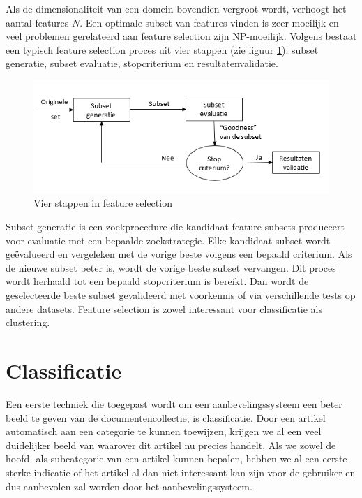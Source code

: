 Als de dimensionaliteit van een domein bovendien vergroot wordt, verhoogt het aantal features $N$. Een optimale subset van features vinden is zeer moeilijk en veel problemen gerelateerd aan feature selection zijn NP-moeilijk. Volgens \cite{Liu2005} bestaat een typisch feature selection proces uit vier stappen (zie figuur \ref{fig:feature-selection}); subset generatie, subset evaluatie, stopcriterium en resultatenvalidatie.

\begin{figure}[h]
	\caption{Vier stappen in feature selection}
	\label{fig:feature-selection}
	\includegraphics[width=\textwidth]{fig/feature-selection}
\end{figure}

Subset generatie is een zoekprocedure die kandidaat feature subsets produceert voor evaluatie met een bepaalde zoekstrategie. Elke kandidaat subset wordt ge\"evalueerd en vergeleken met de vorige beste volgens een bepaald criterium. Als de nieuwe subset beter is, wordt de vorige beste subset vervangen. Dit proces wordt herhaald tot een bepaald stopcriterium is bereikt. Dan wordt de geselecteerde beste subset gevalideerd met voorkennis of via verschillende tests op andere datasets. Feature selection is zowel interessant voor classificatie als clustering. 

\section{Classificatie}
Een eerste techniek die toegepast wordt om een aanbevelingssysteem een beter beeld te geven van de documentencollectie, is classificatie. Door een artikel automatisch aan een categorie te kunnen toewijzen, krijgen we al een veel duidelijker beeld van waarover dit artikel nu precies handelt. Als we zowel de hoofd- als subcategorie van een artikel kunnen bepalen, hebben we al een eerste sterke indicatie of het artikel al dan niet interessant kan zijn voor de gebruiker en dus aanbevolen zal worden door het aanbevelingssysteem. 

